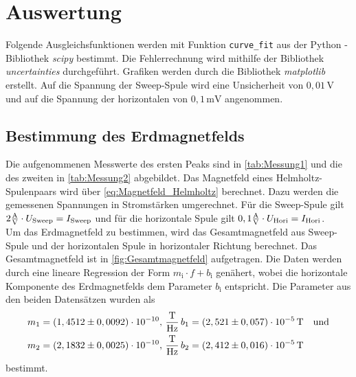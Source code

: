 \section{Auswertung}
\label{sec:auswertung}

Folgende Ausgleichsfunktionen werden mit Funktion \texttt{curve\_fit} aus der Python \cite{py}-Bibliothek \textit{scipy} \cite{2020SciPy-NMeth} bestimmt.
Die Fehlerrechnung wird mithilfe der Bibliothek \textit{uncertainties} \cite{unp} durchgeführt.
Grafiken werden durch die Bibliothek \textit{matplotlib} \cite{Hunter:2007} erstellt. 
Auf die Spannung der Sweep-Spule wird eine Unsicherheit von $0,01 \, \unit{\volt}$ und auf die Spannung der horizontalen von $0,1 \, \unit{\milli\volt} $ angenommen.

\subsection{Bestimmung des Erdmagnetfelds}

Die aufgenommenen Messwerte des ersten Peaks sind in \autoref{tab:Messung1} und die des zweiten in \autoref{tab:Messung2} abgebildet.
Das Magnetfeld eines Helmholtz-Spulenpaars wird über \eqref{eq:Magnetfeld_Helmholtz} berechnet.
Dazu werden die gemessenen Spannungen in Stromstärken umgerechnet.
Für die Sweep-Spule gilt $2 \si{\frac{\ampere}{\volt}} \cdot U_\text{Sweep} = I_\text{Sweep}$ und für die horizontale Spule gilt $0,1 \si{\frac{\ampere}{\volt}} \cdot U_\text{Hori} = I_\text{Hori}$.\\
Um das Erdmagnetfeld zu bestimmen, wird das Gesamtmagnetfeld aus Sweep-Spule und der horizontalen Spule in horizontaler Richtung berechnet.
Das Gesamtmagnetfeld ist in \autoref{fig:Gesamtmagnetfeld} aufgetragen. 
Die Daten werden durch eine lineare Regression der Form $m_\text{i} \cdot f + b_\text{i}$ genähert,
wobei die horizontale Komponente des Erdmagnetfelds dem Parameter $b_\text{i}$ entspricht.
Die Parameter aus den beiden Datensätzen wurden als 
\begin{align*}
    &m_1 =   \left( 1,4512 \pm 0,0092 \right) \cdot 10^{-10},\, \unit{\dfrac{\tesla}{\hertz}} \, b_1 = \left( 2,521  \pm 0,057 \right) \cdot 10^{-5}\, \unit{\tesla} \quad \text{und} \\
    &m_2 =   \left( 2,1832 \pm 0,0025 \right) \cdot 10^{-10},\, \unit{\dfrac{\tesla}{\hertz}} \, b_2 = \left( 2,412  \pm 0,016 \right) \cdot 10^{-5}\, \unit{\tesla} \\
\end{align*}
bestimmt.


